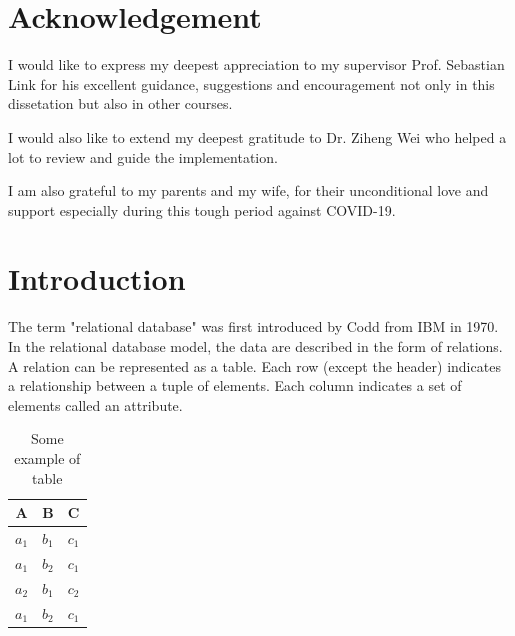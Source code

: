 \documentclass[11pt]{book}
\begin{document}
\chapter*{Acknowledgement}       
\setcounter{page}{2}
\pagestyle{headings}


I would like to express my deepest appreciation to my supervisor Prof. Sebastian Link for his excellent guidance, suggestions and encouragement not only in this dissetation but also in other courses.

I would also like to extend my deepest gratitude to Dr. Ziheng Wei who helped a lot to review and guide the implementation.

I am also grateful to my parents and my wife, for their unconditional love and support especially during this tough period against COVID-19.



\setcounter{secnumdepth}{3}
\setcounter{tocdepth}{3}
\tableofcontents

	
\chapter{Introduction}

The term "relational database" was first introduced by Codd \cite{codd13f} from IBM in 1970. In the relational database model, the data are described in the form of relations. A relation can be represented as a table. Each row (except the header) indicates a relationship between a tuple of elements. Each column indicates a set of elements called an attribute.

\begin{table}[H]
	\centering
	
	\begin{tabular}{ c c c }
		A     & B     & C \\
		\hline
		$a_1$ & $b_1$ & $c_1$ \\ 
		$a_1$ & $b_2$ & $c_1$ \\ 
		$a_2$ & $b_1$ & $c_2$ \\
		$a_1$ & $b_2$ & $c_1$ \\
	\end{tabular}
	
	\caption{Some example of table}
	
	\label{example_table_1}
\end{table}
\end{document}
